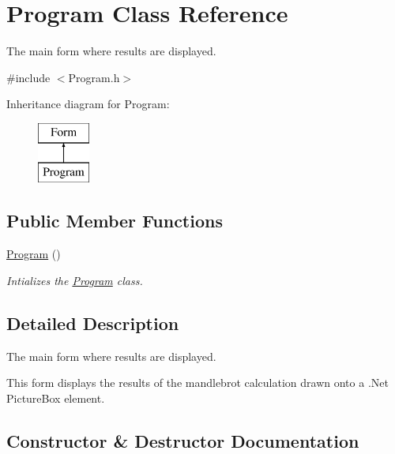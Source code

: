 \hypertarget{class_program}{}\section{Program Class Reference}
\label{class_program}


The main form where results are displayed.  




{\ttfamily \#include $<$Program.\+h$>$}

Inheritance diagram for Program\+:\begin{figure}[H]
\begin{center}
\leavevmode
\includegraphics[height=2.000000cm]{class_program}
\end{center}
\end{figure}
\subsection*{Public Member Functions}
\begin{DoxyCompactItemize}
\item 
\hyperlink{class_program_aaefaa0df08f3484476fc4d61e97acbdc}{Program} ()
\begin{DoxyCompactList}\small\item\em Intializes the \hyperlink{class_program}{Program} class. \end{DoxyCompactList}\end{DoxyCompactItemize}


\subsection{Detailed Description}
The main form where results are displayed. 

This form displays the results of the mandlebrot calculation drawn onto a .Net Picture\+Box element. 

\subsection{Constructor \& Destructor Documentation}
\hypertarget{class_program_aaefaa0df08f3484476fc4d61e97acbdc}{}
